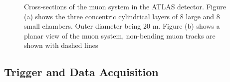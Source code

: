 \begin{figure}[H]
  \centering
  \qquad
  \caption{Cross-sections of the muon system in the ATLAS detector. Figure (a) shows the three concentric cylindrical layers of 8 large and 8 small chambers. Outer diameter being 20 m. 
  Figure (b) shows a planar view of the muon system, non-bending muon tracks are shown with dashed lines \cite{atlas}}
  \label{fig:muon_sys}
\end{figure}

\subsection{Trigger and Data Acquisition}


